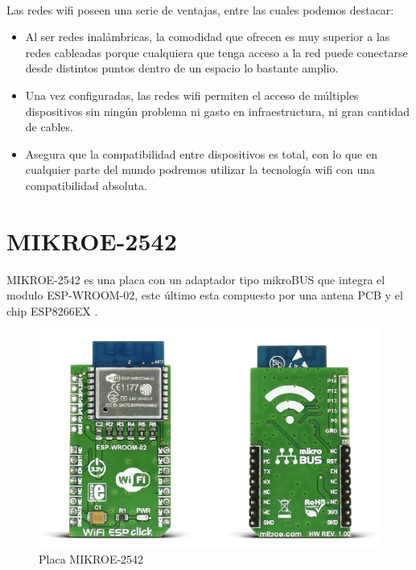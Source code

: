 \paragraph{}
Las redes wifi poseen una serie de ventajas, entre las cuales podemos destacar:
\begin{itemize}
	\item Al ser redes inalámbricas, la comodidad que ofrecen es muy superior a las redes cableadas porque cualquiera que tenga acceso a la red puede conectarse desde distintos puntos dentro de un espacio lo bastante amplio.
    \item Una vez configuradas, las redes wifi permiten el acceso de múltiples dispositivos sin ningún problema ni gasto en infraestructura, ni gran cantidad de cables.
    \item Asegura que la compatibilidad entre dispositivos es total, con lo que en cualquier parte del mundo podremos utilizar la tecnología wifi con una compatibilidad absoluta. 
\end{itemize}
 
 
 
\section{MIKROE-2542}

MIKROE-2542 es una placa con un adaptador tipo mikroBUS que integra el modulo ESP-WROOM-02, este último esta compuesto por una antena PCB y el chip ESP8266EX \citep{MarcoTeorico5}.

\begin{figure}[H]
	\centering
	\includegraphics[scale=.25]{Capitulo2/images/mikroe.png}
	\caption{Placa MIKROE-2542}
	\label{fig:diagrama_dispensador}
\end{figure}
